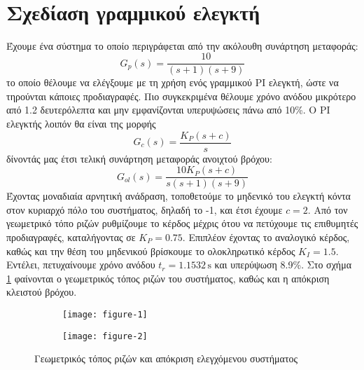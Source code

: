 \documentclass[11pt,a4paper,titlepage, oneside]{article}
\title{
	\vspace{5cm}
	\Huge{\sffamily{\hmwkClass}}\\
	\vspace{0.1em}
	\LARGE{\hmwkTitle}\\
	\vspace{7cm}
}
\author{\sffamily{\hmwkAuthorName\ - \hmwkAuthorAEM}}
\date{} %
\begin{document}
	
	\maketitle
	
	
	
	
	
	\section{Σχεδίαση γραμμικού ελεγκτή}
	Έχουμε ένα σύστημα το οποίο περιγράφεται από την ακόλουθη συνάρτηση μεταφοράς:
	$$ 	G_p(s) = \dfrac{10}{(s+1)(s+9)} 	$$
	το οποίο θέλουμε να ελέγξουμε με τη χρήση ενός γραμμικού PI ελεγκτή, ώστε να τηρούνται κάποιες προδιαγραφές. Πιο συγκεκριμένα θέλουμε χρόνο ανόδου μικρότερο από 1.2 δευτερόλεπτα και μην εμφανίζονται υπερυψώσεις πάνω από 10\%. Ο PI ελεγκτής λοιπόν θα είναι της μορφής
	$$ G_c(s) = \dfrac{K_P (s+c)}{s}$$
	δίνοντάς μας έτσι τελική συνάρτηση μεταφοράς ανοιχτού βρόχου:
	$$ G_{ol}(s) = \dfrac{10 K_P (s+c)}{s (s+1) (s+9)} $$
	Έχοντας μοναδιαία αρνητική ανάδραση, τοποθετούμε το μηδενικό του ελεγκτή κόντα στον κυριαρχό πόλο του συστήματος, δηλαδή το -1, και έτσι έχουμε $c = 2$. Από τον γεωμετρικό τόπο ριζών ρυθμίζουμε το κέρδος μέχρις ότου να πετύχουμε τις επιθυμητές προδιαγραφές, καταλήγοντας σε $K_P = 0.75$. Επιπλέον έχοντας το αναλογικό κέρδος, καθώς και την θέση του μηδενικού βρίσκουμε το ολοκληρωτικό κέρδος $K_I = 1.5$. Εντέλει, πετυχαίνουμε χρόνο ανόδου $t_r = 1.1532\,\mathrm{s} $ και υπερύψωση 8.9\%. Στο σχήμα \ref{fig:pi_plots} φαίνονται ο γεωμετρικός τόπος ριζών του συστήματος, καθώς και η απόκριση κλειστού βρόχου.
	\begin{figure}[h]
		\centering
		\begin{subfigure}[b]{0.49\textwidth}
			\texttt{[image: figure-1]}
		\end{subfigure}
		\begin{subfigure}[b]{0.49\textwidth}
			\texttt{[image: figure-2]}
		\end{subfigure}
		\caption{Γεωμετρικός τόπος ριζών και απόκριση ελεγχόμενου συστήματος}
		\label{fig:pi_plots}
	\end{figure}
\end{document}
